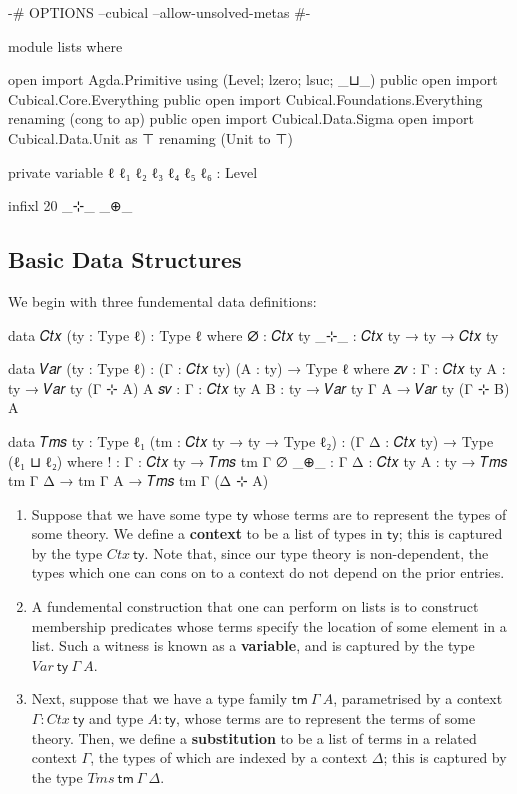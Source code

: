 \begin{code}[hide]
{-# OPTIONS --cubical --allow-unsolved-metas #-}

module lists where

open import Agda.Primitive using (Level; lzero; lsuc; _⊔_) public
open import Cubical.Core.Everything public
open import Cubical.Foundations.Everything renaming (cong to ap) public
open import Cubical.Data.Sigma
open import Cubical.Data.Unit as ⊤ renaming (Unit to ⊤)

private
  variable
    ℓ ℓ₁ ℓ₂ ℓ₃ ℓ₄ ℓ₅ ℓ₆ : Level

infixl 20 _⊹_ _⊕_
\end{code}

\subsection{Basic Data Structures}

We begin with three fundemental data definitions:
\begin{code}
data 𝐶𝑡𝑥 (ty : Type ℓ) : Type ℓ where
  ∅ : 𝐶𝑡𝑥 ty
  _⊹_ : 𝐶𝑡𝑥 ty → ty → 𝐶𝑡𝑥 ty

data 𝑉𝑎𝑟 (ty : Type ℓ) : (Γ : 𝐶𝑡𝑥 ty) (A : ty) → Type ℓ where
  𝑧𝑣 : {Γ : 𝐶𝑡𝑥 ty} {A : ty} → 𝑉𝑎𝑟 ty (Γ ⊹ A) A
  𝑠𝑣 : {Γ : 𝐶𝑡𝑥 ty} {A B : ty} → 𝑉𝑎𝑟 ty Γ A → 𝑉𝑎𝑟 ty (Γ ⊹ B) A

data 𝑇𝑚𝑠 {ty : Type ℓ₁} (tm : 𝐶𝑡𝑥 ty → ty → Type ℓ₂)
     : (Γ Δ : 𝐶𝑡𝑥 ty) → Type (ℓ₁ ⊔ ℓ₂) where
  ! : {Γ : 𝐶𝑡𝑥 ty} → 𝑇𝑚𝑠 tm Γ ∅
  _⊕_ : {Γ Δ : 𝐶𝑡𝑥 ty} {A : ty} → 𝑇𝑚𝑠 tm Γ Δ → tm Γ A → 𝑇𝑚𝑠 tm Γ (Δ ⊹ A)
\end{code}
\begin{enumerate}
\item Suppose that we have some type $\mathsf{ty}$ whose terms are to represent
the types of some theory. We define a \textbf{context} to be a list of types in
$\mathsf{ty}$; this is captured by the type $\mathit{Ctx}~\mathsf{ty}$. Note
that, since our type theory is non-dependent, the types which one can cons on to
a context do not depend on the prior entries.

\item A fundemental construction that one can perform on lists is to construct
membership predicates whose terms specify the location of some element in a
list. Such a witness is known as a \textbf{variable}, and is captured by the
type $\mathit{Var}~\mathsf{ty}~\Gamma~A$.

\item Next, suppose that we have a type family $\mathsf{tm}~\Gamma~A$,
parametrised by a context $\Gamma : \mathit{Ctx}~\mathsf{ty}$ and type $A :
\mathsf{ty}$, whose terms are to represent the terms of some theory. Then, we
define a \textbf{substitution} to be a list of terms in a related context
$\Gamma$, the types of which are indexed by a context $\Delta$; this is captured
by the type $\mathit{Tms}~\mathsf{tm}~\Gamma~\Delta$.
\end{enumerate}

